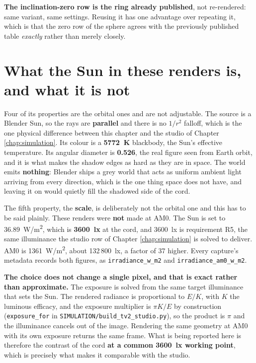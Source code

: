 \textbf{The inclination-zero row is the ring already published}, not
re-rendered: same variant, same settings. Reusing it has one advantage over
repeating it, which is that the zero row of the sphere agrees with the
previously published table \emph{exactly} rather than merely closely.

\section{What the Sun in these renders is, and what it is not}
\label{sec:sun-what}

Four of its properties are the orbital ones and are not adjustable. The
source is a Blender Sun, so the rays are \textbf{parallel} and there is no
$1/r^2$ falloff, which is the one physical difference between this chapter
and the studio of Chapter \ref{chap:simulation}. Its colour is a
\textbf{5772~K} blackbody, the Sun's effective temperature. Its angular
diameter is \textbf{0.526\textdegree}, the real figure seen from Earth
orbit, and it is what makes the shadow edges as hard as they are in space.
The world emits \textbf{nothing}: Blender ships a grey world that acts as
uniform ambient light arriving from every direction, which is the one thing
space does not have, and leaving it on would quietly fill the shadowed side
of the cord.

The fifth property, the \textbf{scale}, is deliberately not the orbital one
and this has to be said plainly. These renders were \textbf{not} made at
AM0. The Sun is set to 36.89~W/m\textsuperscript{2}, which is
\textbf{3600~lx} at the cord, and 3600~lx is requirement R5, the same
illuminance the studio row of Chapter \ref{chap:simulation} is solved to
deliver. AM0 is 1361~W/m\textsuperscript{2}, about 132\,800~lx, a factor of
37 higher. Every capture's metadata records both figures, as
\texttt{irradiance\_w\_m2} and \texttt{irradiance\_am0\_w\_m2}.

\textbf{The choice does not change a single pixel, and that is exact rather
than approximate.} The exposure is solved from the same target illuminance
that sets the Sun. The rendered radiance is proportional to $E/K$, with $K$
the luminous efficacy, and the exposure multiplier is $\pi K / E$ by
construction (\texttt{exposure\_for} in
\texttt{SIMULATION/build\_tv2\_studio.py}), so the product is $\pi$ and the
illuminance cancels out of the image. Rendering the same geometry at AM0
with its own exposure returns the same frame. What is being reported here
is therefore the contrast of the cord \textbf{at a common 3600~lx working
point}, which is precisely what makes it comparable with the studio.

